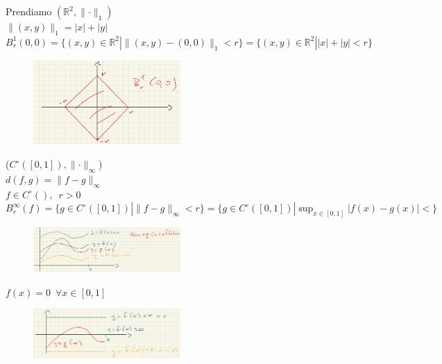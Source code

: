 \documentclass{article}
\newcommand{\R}{\mathbb{R}}
\begin{document}
Prendiamo $(\R^2,\parallel \cdot\parallel_1)$\\
$\parallel(x,y)\parallel_1=|x|+|y|$\\
$B_r^1 (0,0) =\{(x,y)\in \R^2 | \parallel (x,y)-(0,0) \parallel_1 <r \} =\{(x,y)\in \R^2 | |x|+|y| <r \}$
\begin{figure}[h!]
    \centering
    \includegraphics[width=0.5\textwidth]{Screenshot from 2023-03-22 17-45-31.png}
\end{figure}

($C^\circ([0,1]),\parallel\cdot\parallel_\infty$)\\
$d(f,g)=\parallel f-g\parallel_\infty$\\
$f\in C^\circ(),\,\,\, r>0$\\
$B_r^\infty(f)=\{ g\in C^\circ([0,1])| \parallel f-g\parallel_\infty < r \}=\{ g\in C^\circ([0,1])| \sup_{x\in[0,1]} |f(x)-g(x)|<\}$\\
\begin{figure}[h!]
    \centering
    \includegraphics[width=0.5\textwidth]{Screenshot from 2023-03-22 17-45-52.png}
\end{figure}

$f(x)=0 \,\,\, \forall x \in [0,1]$\\

\begin{figure}[h!]
    \centering
    \includegraphics[width=0.5\textwidth]{Screenshot from 2023-03-22 17-46-13.png}
\end{figure}
\end{document}
